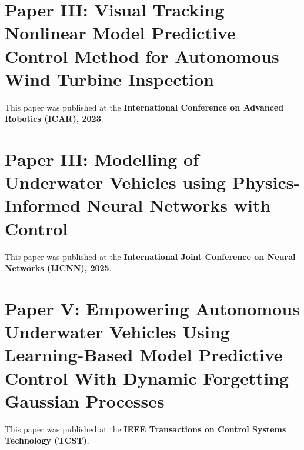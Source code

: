 \documentclass[
10pt, %
b5paper, %
twoside, %
openright  %
]{book}  %
\begin{document}
\chapter*{Paper III: Visual Tracking Nonlinear Model Predictive Control Method for
Autonomous Wind Turbine Inspection}
\vspace{1cm}
This paper was published at the \textbf{International Conference on Advanced Robotics (ICAR), 2023}.


%



\chapter*{Paper III: Modelling of Underwater Vehicles using
Physics-Informed Neural Networks with Control}
\vspace{1cm}
This paper was published at the \textbf{International Joint Conference on Neural Networks (IJCNN), 2025}.



%


\chapter*{Paper V: Empowering Autonomous Underwater Vehicles Using Learning-Based Model
Predictive Control With Dynamic Forgetting Gaussian Processes}
\vspace{1cm}
This paper was published at the \textbf{IEEE Transactions on Control Systems Technology (TCST)}.


%




% 
% 
\end{document}
